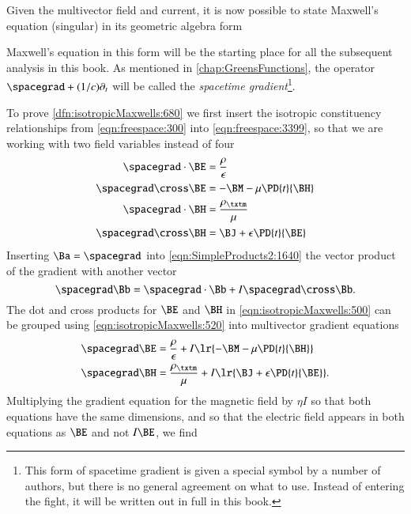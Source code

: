 Given the multivector field and current, it is now possible to state Maxwell's equation (singular) in its geometric algebra form

Maxwell's equation in this form will be the starting place for all the subsequent analysis in this book.
As mentioned in \cref{chap:GreensFunctions}, the operator \( \spacegrad + (1/c) \partial_t \) will be called the \textit{spacetime gradient}\footnote{This form of spacetime gradient is given a special symbol by a number of authors, but there is no general agreement on what to use.
Instead of entering the fight, it will be written out in full in this book.}.

To prove \cref{dfn:isotropicMaxwells:680} we
first insert the
isotropic
constituency relationships from \cref{eqn:freespace:300} into
\cref{eqn:freespace:3399}, so that we are working with two field variables instead of four
\begin{dmath}\label{eqn:isotropicMaxwells:500}
\begin{aligned}
\spacegrad \cdot \BE &= \frac{\rho}{\epsilon} \\
\spacegrad \cross \BE &= - \BM - \mu \PD{t}{\BH} \\
\spacegrad \cdot \BH &= \frac{\rho_\txtm}{\mu} \\
\spacegrad \cross \BH &= \BJ + \epsilon \PD{t}{\BE}
\end{aligned}
\end{dmath}
Inserting \( \Ba = \spacegrad \) into \cref{eqn:SimpleProducts2:1640} the vector product of the gradient with another vector
\begin{dmath}\label{eqn:isotropicMaxwells:520}
\spacegrad \Bb = \spacegrad \cdot \Bb + I \spacegrad \cross \Bb.
\end{dmath}
The dot and cross products for \( \BE \) and \( \BH \) in
\cref{eqn:isotropicMaxwells:500}
can be grouped using \cref{eqn:isotropicMaxwells:520} into multivector gradient equations
\begin{dmath}\label{eqn:isotropicMaxwells:540}
\begin{aligned}
\spacegrad \BE &= \frac{\rho}{\epsilon} + I \lr{ - \BM - \mu \PD{t}{\BH} } \\
\spacegrad \BH &= \frac{\rho_\txtm}{\mu} + I \lr{ \BJ + \epsilon \PD{t}{\BE} }.
\end{aligned}
\end{dmath}
Multiplying the gradient equation for the magnetic field by \( \eta I \) so that both equations have the same dimensions, and so that the electric field appears in both equations as \( \BE \) and not \( I \BE \), we find
